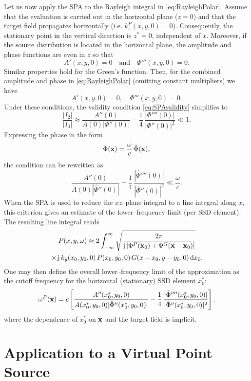 \documentclass[11pt]{article}
\begin{document}
Let us now apply the SPA to the Rayleigh integral in \eqref{eq:RayleighPolar}. Assume that the evaluation is carried out in the horizontal plane (\(z=0\)) and that the target field propagates horizontally (i.e. \(k^P_z(x,y,0)=0\)). Consequently, the stationary point in the vertical direction is \(z^*=0\), independent of \(x\). Moreover, if the source distribution is located in the horizontal plane, the amplitude and phase functions are even in \(z\) so that
\begin{equation}
    A'(x,y,0)=0 \quad \text{and} \quad \Phi'''(x,y,0)=0.
\end{equation}
Similar properties hold for the Green’s function. Then, for the combined amplitude and phase in \eqref{eq:RayleighPolar} (omitting constant multipliers) we have
\begin{equation}
    A'(x,y,0)=0,\quad \Phi'''(x,y,0)=0.
\end{equation}
Under these conditions, the validity condition \eqref{eq:SPAvalidity} simplifies to
\begin{equation}
    \frac{|I_2|}{|I_0|}\approx
    \frac{A''(0)}{A(0)|\Phi''(0)|}
    -\frac{1}{4}\,\frac{|\Phi''''(0)|}{|\Phi''(0)|^2}
    \ll1.
    \label{eq:RayleighSPAvalidity}
\end{equation}
Expressing the phase in the form
\[
\Phi(\mathbf{x})=\frac{\omega}{c}\,\hat{\Phi}(\mathbf{x}),
\]
the condition can be rewritten as
\begin{equation}
    \frac{A''(0)}{A(0)|\hat{\Phi}''(0)|}
    -\frac{1}{4}\,\frac{|\hat{\Phi}''''(0)|}{|\hat{\Phi}''(0)|^2}
    \ll\frac{\omega}{c}.
\end{equation}
When the SPA is used to reduce the \(xz\)–plane integral to a line integral along \(x\), this criterion gives an estimate of the lower–frequency limit (per SSD element). The resulting line integral reads
\begin{multline}
    P(x,y,\omega)\approx2\int_{-\infty}^{\infty}\sqrt{\frac{2\pi}{\mathrm{j}\,|\Phi^P(\mathbf{x}_0)+\Phi^G(\mathbf{x}-\mathbf{x}_0)|}} \\
    \times\,\mathrm{j}\,k_y(x_0,y_0,0)\,P(x_0,y_0,0)\,G(x-x_0,y-y_0,0)\,\mathrm{d} x_0.
\end{multline}
One may then define the overall lower–frequency limit of the approximation as the cutoff frequency for the horizontal (stationary) SSD element \(x_0^*\):
\begin{equation}
    \omega^P(\mathbf{x})=c\left[\frac{A''(x_0^*,y_0,0)}{A(x_0^*,y_0,0)|\hat{\Phi}''(x_0^*,y_0,0)|}
    -\frac{1}{4}\,\frac{|\hat{\Phi}''''(x_0^*,y_0,0)|}{|\hat{\Phi}''(x_0^*,y_0,0)|^2}\right],
\end{equation}
where the dependence of \(x_0^*\) on \(\mathbf{x}\) and the target field is implicit.

\section{Application to a Virtual Point Source}

\end{document}

